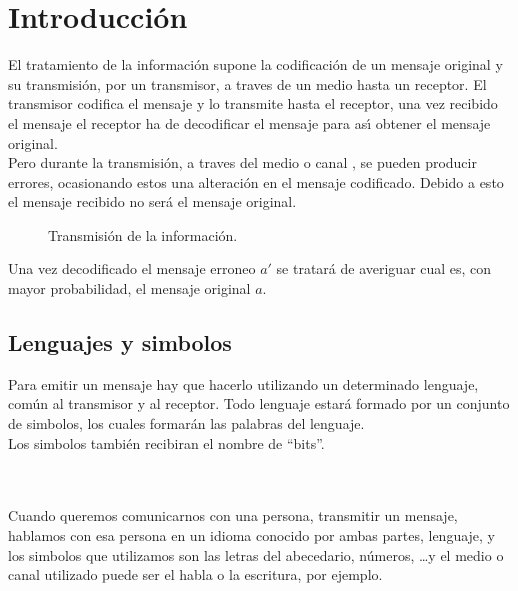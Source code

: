%
%

\chapter{Introducci\'on}

El tratamiento de la informaci\'on supone la codificaci\'on de un mensaje
original y su transmisi\'on, por un transmisor, a traves de un medio hasta un
receptor. El transmisor codifica el mensaje y lo transmite hasta el receptor,
una vez recibido el mensaje el receptor ha de decodificar el mensaje para
as\'{\i} obtener el mensaje original.\\

Pero durante la transmisi\'on, a traves del medio o canal , se pueden producir
errores, ocasionando estos una alteraci\'on en el mensaje codificado. Debido a
esto el mensaje recibido no ser\'a el mensaje original.

\begin{figure}[!hbp]
\begin{center}

\end{center}
\caption{Transmisi\'on de la informaci\'on.}
\end{figure}

Una vez decodificado el mensaje erroneo $a'$ se tratar\'a de averiguar cual es,
con mayor probabilidad, el mensaje original $a$.

%
%

\section{Lenguajes y simbolos}

Para emitir un mensaje hay que hacerlo utilizando un determinado lenguaje,
com\'un al transmisor y al receptor. Todo lenguaje estar\'a formado por un
conjunto de simbolos, los cuales formar\'an las palabras del lenguaje.\\

Los simbolos tambi\'en recibiran el nombre de ``bits''.

\begin{ejemplo}
\ \\ \\
Cuando queremos comunicarnos con una persona, transmitir un mensaje, hablamos
con esa persona en un idioma conocido por ambas partes, lenguaje, y los
simbolos que utilizamos son las letras del abecedario, n\'umeros, \dots y el
medio o canal utilizado puede ser el habla o la escritura, por ejemplo.
\end{ejemplo} 

